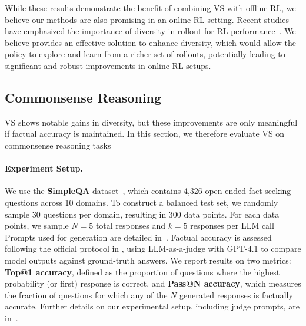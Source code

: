 While these results demonstrate the benefit of combining VS with offline-RL, we believe our methods are also promising in an online RL setting. Recent studies have emphasized the importance of diversity in rollout for RL performance~\citep{cui2025entropymechanismreinforcementlearning, wang20258020rulehighentropyminority}. We believe \ourslower provides an effective solution to enhance diversity, which would allow the policy to explore and learn from a richer set of rollouts, potentially leading to significant and robust improvements in online RL setups.

\newpage
\subsection{Commonsense Reasoning}\label{appendix:commonsense}

VS shows notable gains in diversity, but these improvements are only meaningful if factual accuracy is maintained. In this section, we therefore evaluate VS on commonsense reasoning tasks~\citep{wei2024measuringshortformfactualitylarge} 

\paragraph{Experiment Setup.} 
We use the \textbf{SimpleQA} dataset~\citep{wei2024measuringshortformfactualitylarge}, which contains 4,326 open-ended fact-seeking questions across 10 domains. 
To construct a balanced test set, we randomly sample 30 questions per domain, resulting in 300 data points. 
For each data points, we sample $N=5$ total responses and $k=5$ responses per LLM call 
Prompts used for generation are detailed in~.
Factual accuracy is assessed following the official protocol in \citet{wei2024measuringshortformfactualitylarge}, using LLM-as-a-judge with GPT-4.1 to compare model outputs against ground-truth answers. 
We report results on two metrics: \textbf{Top@1 accuracy}, defined as the proportion of questions where the highest probability (or first) response is correct, and \textbf{Pass@N accuracy}, which measures the fraction of questions for which any of the $N$ generated responses is factually accurate. 
Further details on our experimental setup, including judge prompts, are in~.

